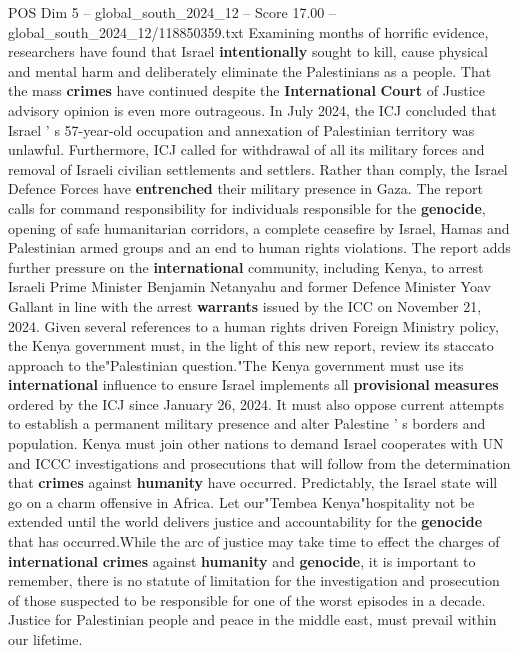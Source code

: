 \begin{textsample}{POS Dim 5 – global\_south\_2024\_12 – Score 17.00 – global\_south\_2024\_12/118850359.txt}
Examining months of horrific evidence, researchers have found that Israel \textbf{intentionally} sought to kill, cause physical and mental harm and deliberately eliminate the Palestinians as a people.
That the mass \textbf{crimes} have continued despite the \textbf{International} \textbf{Court} of Justice advisory opinion is even more outrageous.
In July 2024, the ICJ concluded that Israel ' s 57-year-old occupation and annexation of Palestinian territory was unlawful.
Furthermore, ICJ called for withdrawal of all its military forces and removal of Israeli civilian settlements and settlers.
Rather than comply, the Israel Defence Forces have \textbf{entrenched} their military presence in Gaza.
The report calls for command responsibility for individuals responsible for the \textbf{genocide}, opening of safe humanitarian corridors, a complete ceasefire by Israel, Hamas and Palestinian armed groups and an end to human rights violations.
The report adds further pressure on the \textbf{international} community, including Kenya, to arrest Israeli Prime Minister Benjamin Netanyahu and former Defence Minister Yoav Gallant in line with the arrest \textbf{warrants} issued by the ICC on November 21, 2024.
Given several references to a human rights driven Foreign Ministry policy, the Kenya government must, in the light of this new report, review its staccato approach to the"Palestinian question."The Kenya government must use its \textbf{international} influence to ensure Israel implements all \textbf{provisional} \textbf{measures} ordered by the ICJ since January 26, 2024.
It must also oppose current attempts to establish a permanent military presence and alter Palestine ' s borders and population.
Kenya must join other nations to demand Israel cooperates with UN and ICCC investigations and prosecutions that will follow from the determination that \textbf{crimes} against \textbf{humanity} have occurred.
Predictably, the Israel state will go on a charm offensive in Africa.
Let our"Tembea Kenya"hospitality not be extended until the world delivers justice and accountability for the \textbf{genocide} that has occurred.While the arc of justice may take time to effect the charges of \textbf{international} \textbf{crimes} against \textbf{humanity} and \textbf{genocide}, it is important to remember, there is no statute of limitation for the investigation and prosecution of those suspected to be responsible for one of the worst episodes in a decade.
Justice for Palestinian people and peace in the middle east, must prevail within our lifetime.

\end{textsample}
